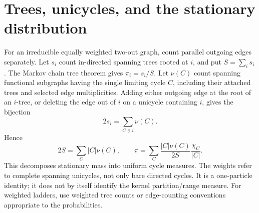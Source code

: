\section{Trees, unicycles, and the stationary distribution}
For an irreducible equally weighted two-out graph, count parallel outgoing
edges separately. Let $s_i$ count in-directed spanning trees rooted at $i$,
and put $S=\sum_i s_i$. The Markov chain tree theorem gives $\pi_i=s_i/S$.
Let $\nu(C)$ count spanning functional subgraphs having the single limiting
cycle $C$, including their attached trees and selected edge multiplicities.
Adding either outgoing edge at the root of an $i$-tree, or deleting the edge
out of $i$ on a unicycle containing $i$, gives the bijection
\[
 2s_i=\sum_{C\ni i}\nu(C).
\]
Hence
\[
 2S=\sum_C|C|\nu(C),\qquad
 \pi=\sum_C\frac{|C|\nu(C)}{2S}\frac{\chi_C}{|C|}.
\]
This decomposes stationary mass into uniform cycle measures. The weights
refer to complete spanning unicycles, not only bare directed cycles.
It is a one-particle identity; it does not by itself identify the kernel
partition/range measure. For weighted ladders, use weighted tree counts or
edge-counting conventions appropriate to the probabilities.
